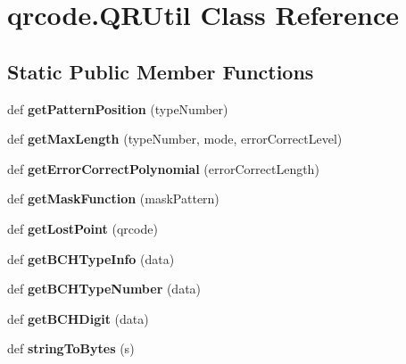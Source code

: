 \hypertarget{classqrcode_1_1_q_r_util}{}\section{qrcode.\+Q\+R\+Util Class Reference}
\label{classqrcode_1_1_q_r_util}
\subsection*{Static Public Member Functions}
\begin{DoxyCompactItemize}
\item 
\mbox{\label{classqrcode_1_1_q_r_util_a27e4145289b0cb9f342b19ea8179ee26}} 
def {\bfseries get\+Pattern\+Position} (type\+Number)
\item 
\mbox{\label{classqrcode_1_1_q_r_util_af034c00b69fd83cc160242b6a234b2d8}} 
def {\bfseries get\+Max\+Length} (type\+Number, mode, error\+Correct\+Level)
\item 
\mbox{\label{classqrcode_1_1_q_r_util_ab0f280e4e0a142b87bd9c1dbcea511b7}} 
def {\bfseries get\+Error\+Correct\+Polynomial} (error\+Correct\+Length)
\item 
\mbox{\label{classqrcode_1_1_q_r_util_a085a1d4792828c69fd3ae564c9adbb8a}} 
def {\bfseries get\+Mask\+Function} (mask\+Pattern)
\item 
\mbox{\label{classqrcode_1_1_q_r_util_a6d933c1a742c228bc4d8a711d95ce7d2}} 
def {\bfseries get\+Lost\+Point} (qrcode)
\item 
\mbox{\label{classqrcode_1_1_q_r_util_af18962ce6547541f93cc5c9b28a2d034}} 
def {\bfseries get\+B\+C\+H\+Type\+Info} (data)
\item 
\mbox{\label{classqrcode_1_1_q_r_util_af7ebebed57c3118b39dae6d93f319dc3}} 
def {\bfseries get\+B\+C\+H\+Type\+Number} (data)
\item 
\mbox{\label{classqrcode_1_1_q_r_util_acbb9169a3f4f01e0b39f81273bd94d8e}} 
def {\bfseries get\+B\+C\+H\+Digit} (data)
\item 
\mbox{\label{classqrcode_1_1_q_r_util_a66f8ebf97a80467684bb77d1b3730c97}} 
def {\bfseries string\+To\+Bytes} (s)
\end{DoxyCompactItemize}
